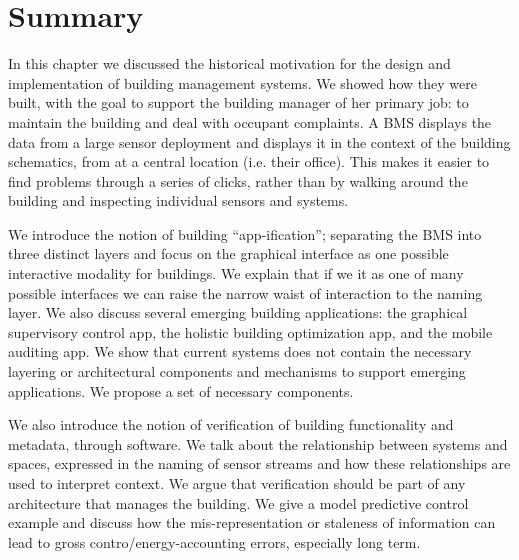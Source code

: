 
\section{Summary}


In this chapter we discussed the historical motivation for the design and implementation of building management systems.
We showed how they were built, with the goal to support the building manager of her primary job: to maintain the 
building and deal with occupant complaints.  A BMS displays the data from a large sensor deployment and displays it in the
context of the building schematics, from at a central location (i.e. their office).  This makes it easier to  
find problems through a series of clicks, rather than by  walking around the building and inspecting
individual sensors and systems.

We introduce the notion of building ``app-ification''; separating the BMS into three distinct layers
and focus on the graphical interface as one possible interactive modality for buildings.  We explain that if we
it as one of many possible interfaces we can raise the narrow waist of interaction to the naming layer.  We also discuss
several emerging building applications: the graphical supervisory control app, the holistic building optimization app,
and the mobile auditing app.  We show that current systems does not contain the necessary layering or architectural components
and mechanisms to support emerging applications.  We propose a set of necessary components.

We also introduce the notion of verification of building functionality and metadata, through software.  We talk about the
relationship between systems and spaces, expressed in the naming of sensor streams and how these relationships are used
to interpret context.  We argue that verification should be part of any
architecture that manages the building.  We give a model predictive control example and discuss how the mis-representation or
staleness of information can lead to gross contro/energy-accounting errors, especially long term.

